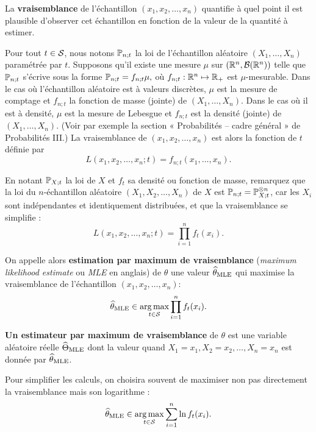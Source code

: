 La \textbf{vraisemblance} de l'échantillon $(x_1, x_2, \dots, x_n)$ quantifie à
quel point il est plausible d'observer cet échantillon en fonction de la valeur
de la quantité à estimer.

Pour tout $t \in \mathcal{S}$, nous notons $\mathbb{P}_{n;t}$ la loi de l'échantillon aléatoire $(X_1,\dots,X_n)$ paramétrée par
$t.$ Supposons qu'il existe une mesure $\mu$ sur $(\mathbb{R}^n, \mathcal{B}(\mathbb{R}^n))$ telle que
$\mathbb{P}_{n;t}$ s'écrive sous la forme $\mathbb{P}_{n;t}= f_{n;t} \mu,$ où
$f_{n;t}: \mathbb{R}^n \mapsto \mathbb{R}_+$ est $\mu$-mesurable. Dans le cas où l'échantillon aléatoire est à valeurs discrètes,
$\mu$ est la mesure de comptage et $f_{n;t}$ la fonction de masse (jointe) de $(X_1,\dots,X_n)$. Dans le
cas où il est à densité, $\mu$ est la mesure de Lebesgue et $f_{n;t}$ est la
densité (jointe) de $(X_1,\dots,X_n)$. (Voir par exemple la section « Probabilités -- cadre général »
de Probabilités III.) La vraisemblance de $(x_1, x_2, \dots, x_n)$ est alors la
fonction de $t$ définie par
\begin{equation}
  L(x_1, x_2, \dots, x_n; t) = f_{n;t}(x_1,\dots,x_n).
  \label{eq:likelihood}
\end{equation}

En notant $\mathbb{P}_{X;t}$ la loi de $X$ et $f_{t}$ sa densité ou fonction de masse, remarquez que la loi du $n$-échantillon aléatoire $(X_1, X_2, \dots, X_n)$ de $X$ est 
$  \mathbb{P}_{n;t} = \mathbb{P}_{X; t}^{\otimes n} $,
car les $X_i$ sont indépendantes et identiquement distribuées, et que la vraisemblance se simplifie :
$$L(x_1, x_2, \dots, x_n; t) = \prod_{i=1}^n f_{t}(x_i).$$

On appelle alors \textbf{estimation par maximum de vraisemblance} ({\it maximum
  likelihood estimate} ou {\it MLE} en anglais) de $\theta$ une valeur
$\widehat{\theta}_{\text{MLE}}$ qui maximise la vraisemblance de l'échantillon
$(x_1, x_2, \dots, x_n)$:
\begin{equation}
  \label{eq:mle_estimator}
  \widehat{\theta}_{\text{MLE}} \in \operatorname*{arg\,max}_{t \in \mathcal{S}} \prod_{i=1}^n f_t(x_i).
\end{equation}

\textbf{Un estimateur par maximum de vraisemblance} de $\theta$ est une
variable aléatoire réelle $\widehat{\Theta}_{\text{MLE}}$ dont la valeur quand
$X_1=x_1, X_2=x_2, \dots, X_n=x_n$ est donnée par $\widehat{\theta}_{\text{MLE}}$.

Pour simplifier les calculs, on choisira souvent de maximiser non pas
directement la vraisemblance mais son logarithme :
\begin{equation}
  \label{eq:lmle_estimator} 
  \widehat{\theta}_{\text{MLE}} \in \operatorname*{arg\,max}_{t \in \mathcal{S}}\sum_{i=1}^n \ln f_t(x_i).
\end{equation}

